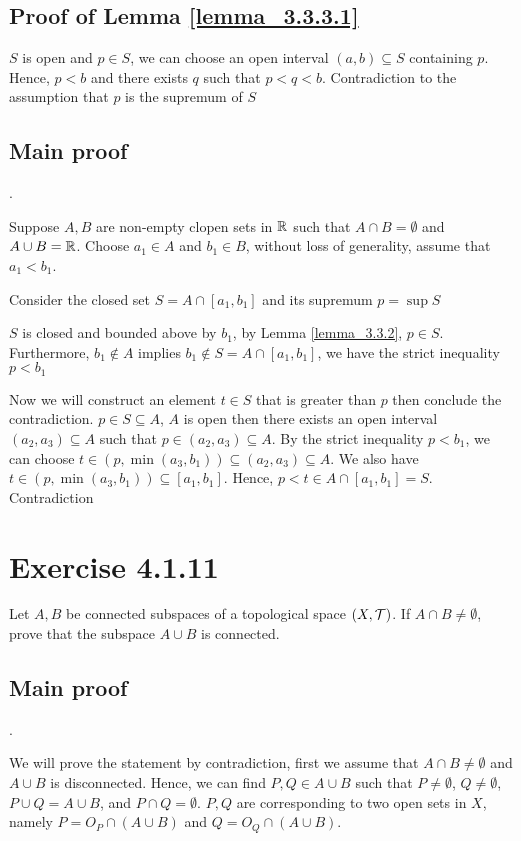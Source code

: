 \documentclass{article}
\begin{document}
\subsection*{Proof of Lemma \ref{lemma_3.3.3.1}}

$S$ is open and $p \in S$, we can choose an open interval $(a, b) \subseteq S$ containing $p$. Hence, $p < b$ and there exists $q$ such that $p < q < b$. Contradiction to the assumption that $p$ is the supremum of $S$

\subsection*{Main proof} .

Suppose $A, B$ are non-empty clopen sets in $\mathbb{R}$ such that $A \cap B = \emptyset$ and $A \cup B = \mathbb{R}$. Choose $a_1 \in A$ and $b_1 \in B$, without loss of generality, assume that $a_1 < b_1$.

Consider the closed set $S = A \cap [a_1, b_1]$ and its supremum $p = \sup S$

$S$ is closed and bounded above by $b_1$, by Lemma \ref{lemma_3.3.2}, $p \in S$. Furthermore, $b_1 \notin A$ implies $b_1 \notin S = A \cap [a_1, b_1]$, we have the strict inequality $p < b_1$

Now we will construct an element $t \in S$ that is greater than $p$ then conclude the contradiction. $p \in S \subseteq A$, $A$ is open then there exists an open interval $(a_2, a_3) \subseteq A$ such that $p \in (a_2, a_3) \subseteq A$. By the strict inequality $p < b_1$, we can choose $t \in (p, \min (a_3, b_1)) \subseteq (a_2, a_3) \subseteq A$. We also have $t \in (p, \min (a_3, b_1)) \subseteq [a_1, b_1]$. Hence, $p < t \in A \cap [a_1, b_1] = S$. Contradiction

\section*{Exercise 4.1.11}

Let $A, B$ be connected subspaces of a topological space $(X, \mathcal{T})$. If $A \cap B \neq \emptyset$, prove that the subspace $A \cup B$ is connected.

\subsection*{Main proof} .

We will prove the statement by contradiction, first we assume that $A \cap B \neq \emptyset$ and $A \cup B$ is disconnected. Hence, we can find $P, Q \in A \cup B$ such that $P \neq \emptyset$, $Q \neq \emptyset$, $P \cup Q = A \cup  B$, and $P \cap Q = \emptyset$. $P, Q$ are corresponding to two open sets in $X$, namely $P = O_P \cap (A \cup B)$ and $Q = O_Q \cap (A \cup B)$.
\end{document}
